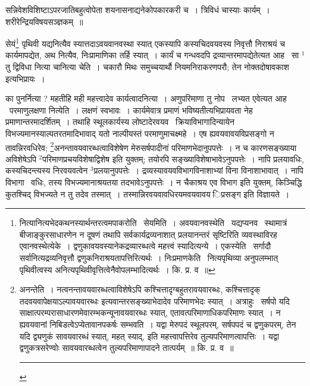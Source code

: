 \documentclass[11pt, openany]{book}
\begin{document}
\newpage
\indent
\hangindent=2cm {\knu सन्निवेशविशिष्टाऽपरजातिबहुत्वोपेता शयनासनाद्यनेकोपकारकरी च~। त्रिविधं चास्याः कार्यम्~। शरीरेन्द्रियविषयसञ्ज्ञकम्~॥}

सेयं\renewcommand{\thefootnote}{१}\footnote{नित्यानित्यभेदकथनस्यार्थन्तरत्वमपाकरोति \textendash\ सेयमिति~। अवयवानवस्थेति \textendash\ यद्यप्यनव \textendash\ स्थामात्रं बीजाङ्कुरसाधारणेन न दूषणं तथापि सर्वकार्यद्रव्यनाशात् प्रलयानन्तरं सृष्टिरिति व्यवस्थाविरह एवानवस्थेत्येके~। द्वणुकावयवस्यानेकद्रव्यारब्धत्वे महत्त्वं स्यादित्यन्ये~। एकस्येति \textendash\ सर्गादौ सर्वानित्यद्रव्यनिवृत्तौ द्वणुकनिराश्रयतापत्तिरित्यर्थः~। निःप्रमाणकेति \textendash\ नित्यपृथिव्या अनुपलम्भात् पृथिवीत्वस्य अनित्यपृथिवीवृत्तित्वेनैवोपलम्भादित्यर्थः~। कि. प्र. व~॥} पृथिवी यद्यनित्यैव स्यात्तदाऽवयवानवस्था स्यात् एकस्यापि कस्यचिदवयवस्य निवृत्तौ निराश्रयं च कार्यमापद्येत, अथ नित्यैव, निःप्रामाणिका तर्हि स्यात्~। कार्यं च गन्धवदपि द्रव्यान्तरमापद्येतेत्यत आह \textendash\ {\knu सा ${}^1$तु द्विविधा नित्या चानित्या चेति}~। चकारौ मिथः समुच्चयार्थौ नियमनिराकरणपरौ; तेन नोक्तदोषावकाश इत्यभिप्रायः~।

का पुनर्नित्या ? महतीहि मही महत्त्वादेव कार्यत्वादनित्या~। अणुपरिमाणा तु नोप \textendash\ लभ्यत एवेत्यत आह \textendash\ {\knu परमाणुलक्षणा नित्ये}ति~। लक्षणं स्वभावः~। कार्यमेवात्र प्रमाणं भविष्यतीत्यभिप्रायवता नेह प्रमाणान्तरमादर्शितम्~। तथाहि स्थूलकार्यस्य लोष्टादेरवयव \textendash\ क्रियाविभागादिन्यायेन विभज्यमानस्याल्पतरतमादिभावाद् यतो नाल्पीयस्तं परमाणुमाचक्ष्महे~। एष ह्यवयवावयविप्रसङ्गो न तावन्निरवधिरेव; \renewcommand{\thefootnote}{२}\footnote{अनन्तेति~। नत्वनन्तावयवारब्धत्वाविशेषेऽपि कश्चित्तादृग्बहुतरावयवारब्धः, कश्चित्तादृक् तदवयवापेक्षयाऽल्पावयवारब्धः इत्यवान्तरसङ्ख्याभेदादेव परिमाणभेदः स्यात्~। अत्राहुः \textendash\ सर्षपो यदि साक्षात्परम्परासाधारणमेवारम्भकन्यूनावयवारब्धः स्यात्, एतावत्परिमाणाधिकपरिमाणः स्यात्~। न ह्यवयवानां निबिडत्वेऽप्येतावानपकर्षः सम्भवति~। यद्वा मेरुपदं स्थूलपरम्, सर्षपपदं च द्वणुकपरम्, तेन यदि द्व्यणुकं सावयवारब्धं स्यात्, महत् स्याद्, इति महत्त्वापत्तिरेव तुल्यपरिमाणत्वापत्तिः~। यद्वा द्वणुकत्रसरेण्वोः सावयवारब्धत्वेन तुल्यपरिमाणापादने तात्पर्यम्~॥ कि. प्र. व~॥\\ \rule{0.4\linewidth}{0.5pt}}अनन्तावयवारब्धत्वाविशेषेण मेरुसर्षपादीनां परिमाणभेदानुपपत्तेः~। न च कारणसङ्ख्याया अविशेषेऽपि ${}^2$परिमाणप्रचयविशेषाद्विशेष इति युक्तम्; तयोरपि सङ्ख्याविशेषाभावेऽनुपपत्तेः~। नापि प्रलयावधिः, कस्यचिदन्त्यस्य निरवयवत्वेन ${}^3$प्रलयानुपपत्तेः~। द्रव्यस्यावयवविभागविनाशाभ्यां विना विनाशाभावात्~। नापि विभागा \textendash\ वधिः, तस्य विभज्यमानाश्रयतया तदभावेऽनुपपत्तेः~। न चैकाश्रय एव विभाग इति युक्तम्, किञ्चिद्धि कुतश्चिद् विभज्यते न तु तदेव तस्मात्~। तस्मान्निरवयवावधिरयमवयवावय िप्रसङ्ग इति विज्ञायते~।
\end{document}

